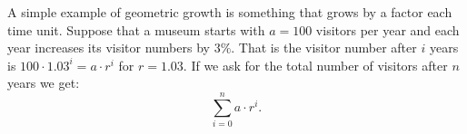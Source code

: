A simple example of geometric growth is something that grows by a factor
each time unit. Suppose that a museum starts with
$a=100$ visitors per year and each year increases its visitor numbers by
$3\%$. That is the visitor number after $i$ years is $100\cdot 1.03^i=a\cdot
r^i$ for $r=1.03$.
If we ask for the total number of visitors after $n$ years we get:
\[
\sum_{i=0}^n a\cdot r^i.
\]

%
%

